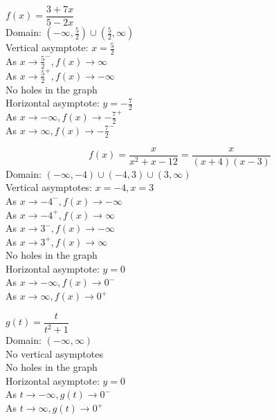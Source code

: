 \begin{exenum}
\item $f(x) = \dfrac{3 + 7x}{5 - 2x}$\\
Domain: $(-\infty, \frac{5}{2}) \cup (\frac{5}{2}, \infty)$\\
Vertical asymptote: $x = \frac{5}{2}$\\
As $x \rightarrow \frac{5}{2}^{-}, f(x) \rightarrow \infty$\\
As $x \rightarrow \frac{5}{2}^{+}, f(x) \rightarrow -\infty$\\
No holes in the graph\\
Horizontal asymptote: $y = -\frac{7}{2}$ \\
As $x \rightarrow -\infty, f(x) \rightarrow -\frac{7}{2}^{+}$\\
As $x \rightarrow \infty, f(x) \rightarrow -\frac{7}{2}^{-}$\\

\item 
\[f(x) = \dfrac{x}{x^{2} + x - 12} = \dfrac{x}{(x + 4)(x - 3)}\]
Domain: $(-\infty, -4) \cup (-4, 3) \cup (3, \infty)$\\
Vertical asymptotes: $x = -4, x = 3$\\
As $x \rightarrow -4^{-}, f(x) \rightarrow -\infty$\\
As $x \rightarrow -4^{+}, f(x) \rightarrow \infty$\\
As $x \rightarrow 3^{-}, f(x) \rightarrow -\infty$\\
As $x \rightarrow 3^{+}, f(x) \rightarrow \infty$\\
No holes in the graph\\
Horizontal asymptote: $y = 0$ \\
As $x \rightarrow -\infty, f(x) \rightarrow 0^{-}$\\
As $x \rightarrow \infty, f(x) \rightarrow 0^{+}$\\

\item $g(t) = \dfrac{t}{t^{2} + 1}$\\
Domain: $(-\infty, \infty)$\\
No vertical asymptotes\\
No holes in the graph\\
Horizontal asymptote: $y = 0$ \\
As $t \rightarrow -\infty, g(t) \rightarrow 0^{-}$\\
As $t \rightarrow \infty, g(t) \rightarrow 0^{+}$\\


\end{exenum}
